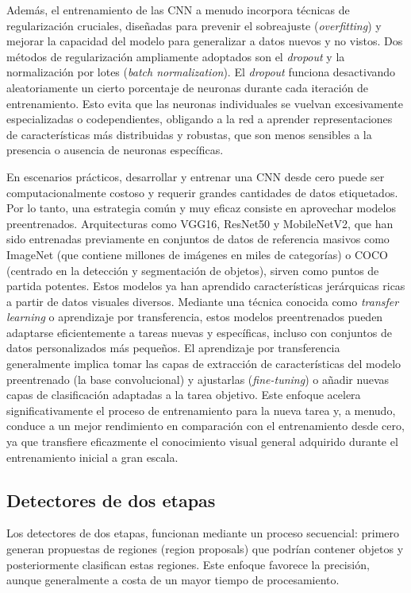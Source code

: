 \documentclass[11pt,spanish,listoffigures,listoftables]{tfgetsinf}
\begin{document}
Además, el entrenamiento de las CNN a menudo incorpora técnicas de regularización cruciales, diseñadas para prevenir el sobreajuste (\textit{overfitting}) y mejorar la capacidad del modelo para generalizar a datos nuevos y no vistos. Dos métodos de regularización ampliamente adoptados son el \textit{dropout} y la normalización por lotes (\textit{batch normalization}). El \textit{dropout} funciona desactivando aleatoriamente un cierto porcentaje de neuronas durante cada iteración de entrenamiento. Esto evita que las neuronas individuales se vuelvan excesivamente especializadas o codependientes, obligando a la red a aprender representaciones de características más distribuidas y robustas, que son menos sensibles a la presencia o ausencia de neuronas específicas. 

En escenarios prácticos, desarrollar y entrenar una CNN desde cero puede ser computacionalmente costoso y requerir grandes cantidades de datos etiquetados. Por lo tanto, una estrategia común y muy eficaz consiste en aprovechar modelos preentrenados. Arquitecturas como VGG16, ResNet50 y MobileNetV2, que han sido entrenadas previamente en conjuntos de datos de referencia masivos como ImageNet (que contiene millones de imágenes en miles de categorías) o COCO (centrado en la detección y segmentación de objetos), sirven como puntos de partida potentes. Estos modelos ya han aprendido características jerárquicas ricas a partir de datos visuales diversos. Mediante una técnica conocida como \textit{transfer learning} o aprendizaje por transferencia, estos modelos preentrenados pueden adaptarse eficientemente a tareas nuevas y específicas, incluso con conjuntos de datos personalizados más pequeños. El aprendizaje por transferencia generalmente implica tomar las capas de extracción de características del modelo preentrenado (la base convolucional) y ajustarlas (\textit{fine-tuning}) o añadir nuevas capas de clasificación adaptadas a la tarea objetivo. Este enfoque acelera significativamente el proceso de entrenamiento para la nueva tarea y, a menudo, conduce a un mejor rendimiento en comparación con el entrenamiento desde cero, ya que transfiere eficazmente el conocimiento visual general adquirido durante el entrenamiento inicial a gran escala.





\subsection{Detectores de dos etapas}
Los detectores de dos etapas, funcionan mediante un proceso secuencial: primero generan propuestas de regiones (region proposals) que podrían contener objetos y posteriormente clasifican estas regiones. Este enfoque favorece la precisión, aunque generalmente a costa de un mayor tiempo de procesamiento.
\end{document}
